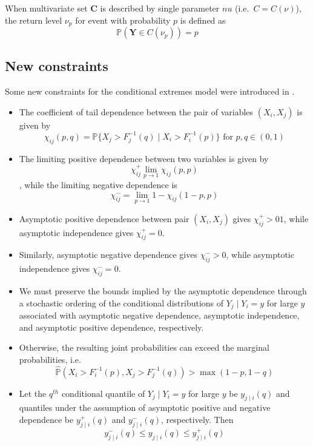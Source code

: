 \documentclass{article}
\numberwithin{equation}{section}
\begin{document}
When multivariate set $\bm{C}$ is described by single parameter $nu$ (i.e.\ $C = C(\nu)$), the return level $\nu_p$ for event with probability $p$ is defined as 
\[
  \mathbb{P}(\bm{Y} \in C(\nu_p)) = p
\]

\subsection{New constraints}

Some new constraints for the conditional extremes model were introduced in \cite{Keef2013}.

\begin{itemize}
  \item The coefficient of tail dependence between the pair of variables $(X_i, X_j)$ is given by
    \[
      \chi_{ij}(p, q) = \mathbb{P}\{X_j > F_j^{-1}(q) \mid X_i > F_i^{-1}(p)\} \text { for } p, q \in (0, 1)
    \]
  \item The limiting positive dependence between two variables is given by 
    \[
      \chi^+_{ij}\lim_{p \rightarrow 1}{\chi_{ij}(p, p)}
    \],
    while the limiting negative dependence is 
    \[
      \chi^-_{ij} = \lim_{p \rightarrow 1}{1-\chi_{ij}(1 - p, p)}
    \]
  \item Asymptotic positive dependence between pair $(X_i, X_j)$ gives $\chi^+_{ij} >0 1$, while asymptotic independence gives $\chi^+_{ij} = 0$.
  \item Similarly, asymptotic negative dependence gives $\chi^-_{ij} > 0$, while asymptotic independence gives $\chi^-_{ij} = 0$.
  \item We must preserve the bounds implied by the asymptotic dependence through a stochastic ordering of the conditional distributions of $Y_j \mid Y_i = y$ for large $y$ associated with asymptotic negative dependence, asymptotic independence, and asymptotic positive dependence, respectively. 
  \item Otherwise, the resulting joint probabilities can exceed the marginal probabilities, i.e.\
    \[
    \hat{\mathbb{P}}(X_i > F_i^{-1}(p),X_j > F_j^{-1}(q)) > \max(1-p, 1-q)
    \]
  \item Let the $q^{th}$ conditional quantile of $Y_j \mid Y_i = y$ for large $y$ be $y_{j \mid i}(q)$ and quantiles under the assumption of asymptotic positive and negative dependence be $y^+_{j \mid i}(q)$ and $y^-_{j \mid i}(q)$, respectively. 
    Then
    \begin{equation} \label{eq:ordering}
      y^-_{j \mid i}(q) \le y_{j \mid i}(q) \le y^+_{j \mid i}(q)

\end{equation}
\end{itemize}
\end{document}
